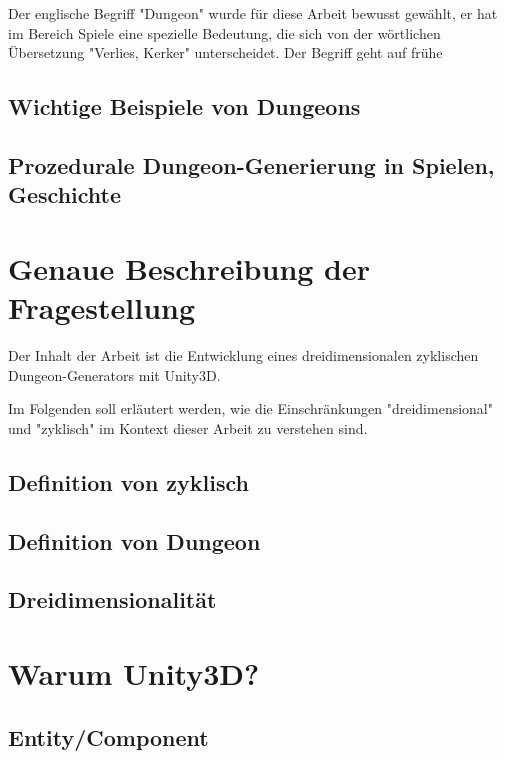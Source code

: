 Der englische Begriff "Dungeon" wurde für diese Arbeit bewusst gewählt, er hat im Bereich Spiele eine spezielle Bedeutung, 
die sich von der wörtlichen Übersetzung "Verlies, Kerker" unterscheidet.  Der Begriff geht auf frühe 

\subsection{Wichtige Beispiele von Dungeons}


\subsection{Prozedurale Dungeon-Generierung in Spielen, Geschichte}

\section{Genaue Beschreibung der Fragestellung}

Der Inhalt der Arbeit ist die Entwicklung eines dreidimensionalen zyklischen Dungeon-Generators mit Unity3D. 

Im Folgenden soll erläutert werden, wie die Einschränkungen "dreidimensional" und "zyklisch" im Kontext dieser Arbeit zu verstehen sind.

\subsection{Definition von zyklisch}\label{c.weitereskapitel}

\subsection{Definition von Dungeon}

\subsection{Dreidimensionalität}

\section{Warum Unity3D?}

\subsection{Entity/Component}

